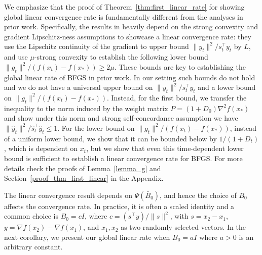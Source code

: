 \documentclass[11pt,letterpaper]{article}
\newcommand\0{{\Vector{0}}}
\newcommand\1{{\Vector{1}}}
\numberwithin{assumption}{section}
\numberwithin{definition}{section}
\numberwithin{theorem}{section}
\numberwithin{remark}{section}
\begin{document}
We emphasize that the proof of Theorem~\ref{thm:first_linear_rate} for showing global linear convergence rate is fundamentally different from the analyses in prior work. Specifically, the results in \cite{jin2024non, qiujiang2020quasinewton, qiujiang2024quasinewton} heavily depend on the strong convexity and gradient Lipschitz-ness assumptions to showcase a linear convergence rate: they use the Lipschitz continuity of the gradient to upper bound  $\|y_t\|^2/s_t^\top y_t$ by $L$, and use $\mu$-strong convexity to establish the following lower bound $\|g_t\|^2/(f(x_t) - f(x_*)) \geq 2\mu$. These bounds are key to establishing the global linear rate of BFGS in prior work. In our setting such bounds do not hold and we do not have a universal upper bound on $\|y_t\|^2/s_t^\top y_t$ and a lower bound on $\|g_t\|^2/(f(x_t) - f(x_*))$. Instead, for the first bound, we transfer the inequality to the norm induced by the  weight matrix $P = (1 + D_0)\nabla^2{f(x_*)}$ and show under this norm and strong self-concordance assumption we have $\|\hat{y}_t\|^2/\hat{s}_t^\top \hat{y}_t\leq 1$. For the lower bound on $\|g_t\|^2/(f(x_t) - f(x_*))$, instead of a uniform lower bound, we show that it can be bounded below by $1/(1 + D_t)$, which is dependent on $x_t$, but we show that even this time-dependent lower bound is sufficient to establish a linear convergence rate for BFGS. For more details check the proofs of  Lemma~\ref{lemma_g} and Section~\ref{proof_thm_first_linear} in the Appendix. 

The linear convergence result depends on $\Psi(\bar{B}_0)$, and hence the choice of $B_0$ affects the convergence rate. In practice, it is often a scaled identity and a common choice is $B_0 = cI$, where $c = ({s^\top y})/{\|s\|^2}$, with $s = x_2 - x_1$, $y = \nabla f(x_2) - \nabla f(x_1)$, and $x_1, x_2 $ as two randomly selected vectors. In the next corollary, we present our global linear rate when $B_0 = a I$ where $a > 0$ is an arbitrary constant.
\end{document}
